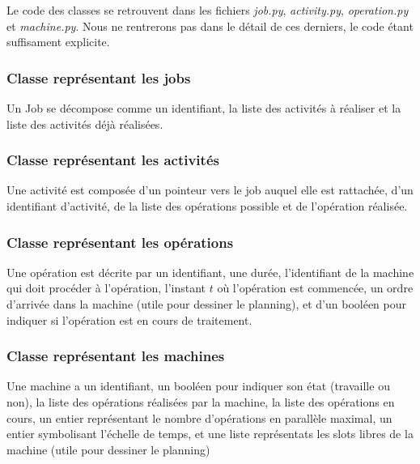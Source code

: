 Le code des classes se retrouvent dans les fichiers \textit{job.py}, \textit{activity.py}, \textit{operation.py} et \textit{machine.py}. Nous ne rentrerons pas dans le détail de ces derniers, le code étant suffisament explicite.

\subsubsection{Classe représentant les jobs}

Un Job se décompose comme un identifiant, la liste des activités à réaliser et la liste des activités déjà réalisées.

\subsubsection{Classe représentant les activités}

Une activité est composée d'un pointeur vers le job auquel elle est rattachée, d'un identifiant d'activité, de la liste des opérations possible et de l'opération réalisée.

\subsubsection{Classe représentant les opérations}

Une opération est décrite par un identifiant, une durée, l'identifiant de la machine qui doit procéder à l'opération, l'instant $t$ où l'opération est commencée, un ordre d'arrivée dans la machine (utile pour dessiner le planning), et d'un booléen pour indiquer si l'opération est en cours de traitement.

\subsubsection{Classe représentant les machines}

Une machine a un identifiant, un booléen pour indiquer son état (travaille ou non), la liste des opérations réalisées par la machine, la liste des opérations en cours, un entier représentant le nombre d'opérations en parallèle maximal, un entier symbolisant l'échelle de temps, et une liste représentats les slots libres de la machine (utile pour dessiner le planning) 